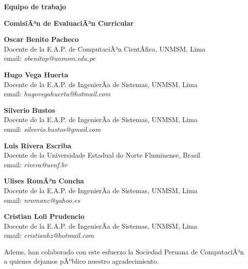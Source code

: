\begin{center}
{\bf \Huge Equipo de trabajo}
\end{center}
\vspace{1cm}

\begin{center}
\textbf{ComisiÃ³n de EvaluaciÃ³n Curricular}\\
\end{center}

\begin{center}
\textbf{Oscar Benito Pacheco}\\
Docente de la E.A.P. de ComputaciÃ³n CientÃ­fica, UNMSM, Lima\\ 
email: \textit{obenitop@unmsm.edu.pe}\\
\end{center}

\begin{center}
\textbf{Hugo Vega Huerta}\\
Docente de la E.A.P. de IngenierÃ­a de Sistemas, UNMSM, Lima\\ 
email: \textit{hugovegahuerta@hotmail.com}\\
\end{center}

\begin{center}
\textbf{Silverio Bustos}\\
Docente de la E.A.P. de IngenierÃ­a de Sistemas, UNMSM, Lima\\ 
email: \textit{silverio.bustos@gmail.com}\\
\end{center}

\begin{center}
\textbf{Luis Rivera Escriba}\\
Docente de la Universidade Estadual do Norte Fluminense, Brasil\\ 
email: \textit{rivera@uenf.br}\\
\end{center}

\begin{center}
\textbf{Ulises RomÃ³n Concha}\\
Docente de la E.A.P. de IngenierÃ­a de Sistemas, UNMSM, Lima\\ 
email: \textit{nromanc@yahoo.es}\\
\end{center}

\begin{center}
\textbf{Cristian Loli Prudencio}\\
Docente de la E.A.P. de IngenierÃ­a de Sistemas, UNMSM, Lima\\ 
email: \textit{cristianhz@hotmail.com}\\
\end{center}

Adem s, han colaborado con este esfuerzo la Sociedad Peruana de ComputaciÃ³n a quienes dejamos pÃºblico nuestro agradecimiento.
